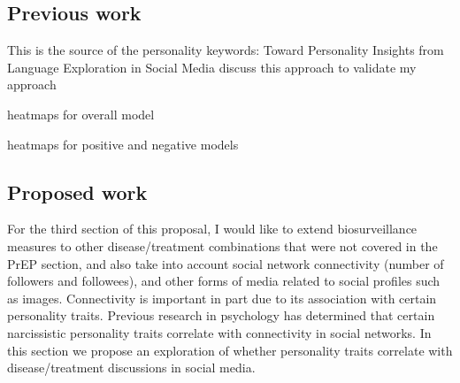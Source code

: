 





\subsection{Previous work}

This is the source of the personality keywords:
Toward Personality Insights from Language Exploration in Social Media
discuss this approach to validate my approach

heatmaps for overall model

heatmaps for positive and negative models

\subsection{Proposed work}


For the third section of this proposal, I would like to extend biosurveillance measures to other disease/treatment combinations that were not covered in the PrEP section, and also take into account social network connectivity (number of followers and followees), and other forms of media related to social profiles such as images. Connectivity is important in part due to its association with certain personality traits. Previous research in psychology has determined that certain narcissistic personality traits correlate with connectivity in social networks\cite{buffardi2008narcissism}. In this section we propose an exploration of whether personality traits correlate with disease/treatment discussions in social media.

